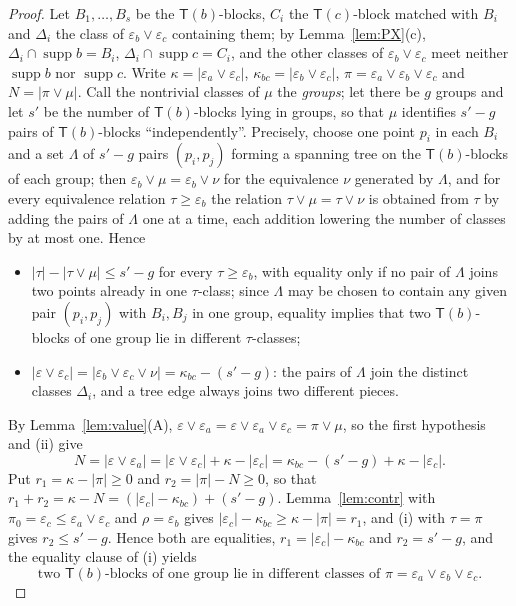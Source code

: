 \documentclass[11pt]{amsart}
\theoremstyle{definition}
\newcommand{\supp}{\operatorname{supp}}
\newcommand{\T}{\mathsf{T}}
\begin{document}
\begin{proof}
Let $B_1,\dots,B_s$ be the $\T(b)$-blocks, $C_i$ the $\T(c)$-block matched with $B_i$ and $\Delta_i$ the class of $\varepsilon_b\vee\varepsilon_c$ containing them; by Lemma~\ref{lem:PX}(c), $\Delta_i\cap\supp b=B_i$, $\Delta_i\cap\supp c=C_i$, and the other classes of $\varepsilon_b\vee\varepsilon_c$ meet neither $\supp b$ nor $\supp c$. Write $\kappa=|\varepsilon_a\vee\varepsilon_c|$, $\kappa_{bc}=|\varepsilon_b\vee\varepsilon_c|$, $\pi=\varepsilon_a\vee\varepsilon_b\vee\varepsilon_c$ and $N=|\pi\vee\mu|$. Call the nontrivial classes of $\mu$ the \emph{groups}; let there be $g$ groups and let $s'$ be the number of $\T(b)$-blocks lying in groups, so that $\mu$ identifies $s'-g$ pairs of $\T(b)$-blocks ``independently''. Precisely, choose one point $p_i$ in each $B_i$ and a set $\Lambda$ of $s'-g$ pairs $(p_i,p_j)$ forming a spanning tree on the $\T(b)$-blocks of each group; then $\varepsilon_b\vee\mu=\varepsilon_b\vee\nu$ for the equivalence $\nu$ generated by $\Lambda$, and for every equivalence relation $\tau\ge\varepsilon_b$ the relation $\tau\vee\mu=\tau\vee\nu$ is obtained from $\tau$ by adding the pairs of $\Lambda$ one at a time, each addition lowering the number of classes by at most one. Hence
\begin{itemize}[nosep]
\item[(i)] $|\tau|-|\tau\vee\mu|\le s'-g$ for every $\tau\ge\varepsilon_b$, with equality only if no pair of $\Lambda$ joins two points already in one $\tau$-class; since $\Lambda$ may be chosen to contain any given pair $(p_i,p_j)$ with $B_i,B_j$ in one group, equality implies that two $\T(b)$-blocks of one group lie in different $\tau$-classes;
\item[(ii)] $|\varepsilon\vee\varepsilon_c|=|\varepsilon_b\vee\varepsilon_c\vee\nu|=\kappa_{bc}-(s'-g)$: the pairs of $\Lambda$ join the distinct classes $\Delta_i$, and a tree edge always joins two different pieces.
\end{itemize}
By Lemma~\ref{lem:value}(A), $\varepsilon\vee\varepsilon_a=\varepsilon\vee\varepsilon_a\vee\varepsilon_c=\pi\vee\mu$, so the first hypothesis and (ii) give
\begin{equation}\label{eq:N}
N=|\varepsilon\vee\varepsilon_a|=|\varepsilon\vee\varepsilon_c|+\kappa-|\varepsilon_c|=\kappa_{bc}-(s'-g)+\kappa-|\varepsilon_c|.
\end{equation}
Put $r_1=\kappa-|\pi|\ge0$ and $r_2=|\pi|-N\ge0$, so that $r_1+r_2=\kappa-N=(|\varepsilon_c|-\kappa_{bc})+(s'-g)$. Lemma~\ref{lem:contr} with $\pi_0=\varepsilon_c\le\varepsilon_a\vee\varepsilon_c$ and $\rho=\varepsilon_b$ gives $|\varepsilon_c|-\kappa_{bc}\ge\kappa-|\pi|=r_1$, and (i) with $\tau=\pi$ gives $r_2\le s'-g$. Hence both are equalities, $r_1=|\varepsilon_c|-\kappa_{bc}$ and $r_2=s'-g$, and the equality clause of (i) yields
\begin{equation}\label{eq:star}
\text{two $\T(b)$-blocks of one group lie in different classes of }\pi=\varepsilon_a\vee\varepsilon_b\vee\varepsilon_c.
\end{equation}


\end{proof}
\end{document}
